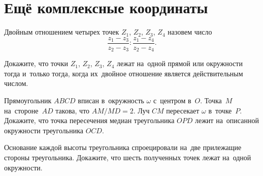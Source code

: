 
\section*{Ещё комплексные координаты}


Двойным отношением четырех точек $Z_1$, $Z_2$, $Z_3$, $Z_4$ назовем число
\[
    \frac{z_1 - z_3}{z_2 - z_3} : \frac{z_1 - z_4}{z_2 - z_4}
.\]

\begin{problems}

\item
Докажите, что точки $Z_1$, $Z_2$, $Z_3$, $Z_4$ лежат на~одной прямой или
окружности тогда и~только тогда, когда их~двойное отношение является
действительным числом.

\item
Прямоугольник $ABCD$ вписан в~окружность $\omega$ с~центром в~$O$.
Точка~$M$ на~стороне~$AD$ такова, что $AM / MD = 2$.
Луч $CM$ пересекает $\omega$ в~точке~$P$.
Докажите, что точка пересечения медиан треугольника $OPD$ лежит на~описанной
окружности треугольника $OCD$.

\item
Основание каждой высоты треугольника спроецировали на~две прилежащие стороны
треугольника.
Докажите, что шесть полученных точек лежат на~одной окружности.

\end{problems}

